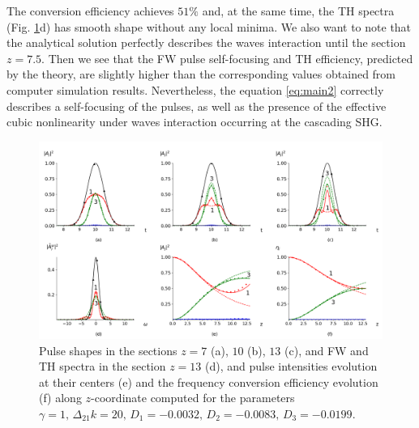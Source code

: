 \documentclass[a4paper, 12pt, onecolumn]{extarticle}
\begin{document}
The conversion efficiency achieves \(51\%\) and, at the same time, the TH spectra (Fig. \ref{fr:c1_1}d)  has smooth shape without any local minima. We also want to note that the analytical solution perfectly describes the waves interaction until the section \(z=7.5\). Then we see that the FW pulse self-focusing and TH efficiency, predicted by the theory, are slightly higher than the corresponding values obtained from computer simulation results. Nevertheless, the equation \eqref{eq:main2} correctly describes a self-focusing of the pulses, as well as the presence of the effective cubic nonlinearity under waves interaction occurring at the cascading SHG.
\begin{figure}[h!] 
\centering 
\includegraphics[width=\linewidth]{Cascade1_1}  
\caption{Pulse shapes in the sections \(z=7\) (a), \(10\) (b), \(13\) (c), and FW and TH spectra in the section \(z=13\) (d), and pulse intensities evolution at their centers (e) and the frequency conversion efficiency evolution (f) along \(z\)-coordinate computed for the parameters $\gamma=1,\, \Delta_{21} k=20,\, D_1=-0.0032,\, D_2=-0.0083,\, D_3=-0.0199.$ } 
\label{fr:c1_1}
\end{figure}
\end{document}
